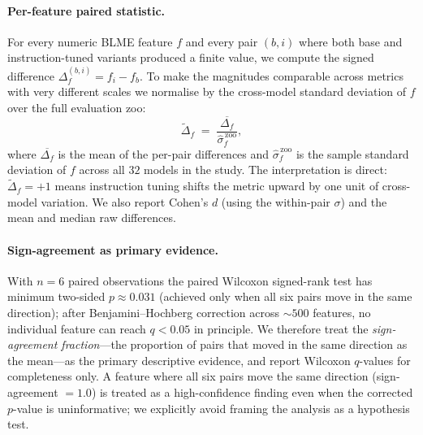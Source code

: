 \documentclass[preprint]{neurips_2025}
\begin{document}
\paragraph{Per-feature paired statistic.}
For every numeric BLME feature $f$ and every pair $(b, i)$ where both base and instruction-tuned variants produced a finite value, we compute the signed difference $\Delta_{f}^{(b,i)} = f_i - f_b$. To make the magnitudes comparable across metrics with very different scales we normalise by the cross-model standard deviation of $f$ over the full evaluation zoo:
\begin{equation}
  \widetilde{\Delta}_f \;=\; \frac{\overline{\Delta_f}}{\hat\sigma_f^{\,\text{zoo}}},
\end{equation}
where $\overline{\Delta_f}$ is the mean of the per-pair differences and $\hat\sigma_f^{\,\text{zoo}}$ is the sample standard deviation of $f$ across all $32$ models in the study. The interpretation is direct: $\widetilde{\Delta}_f = +1$ means instruction tuning shifts the metric upward by one unit of cross-model variation. We also report Cohen's $d$ (using the within-pair $\sigma$) and the mean and median raw differences.

\paragraph{Sign-agreement as primary evidence.}
With $n = 6$ paired observations the paired Wilcoxon signed-rank test has minimum two-sided $p \approx 0.031$ (achieved only when all six pairs move in the same direction); after Benjamini--Hochberg correction across $\sim\!500$ features, no individual feature can reach $q < 0.05$ in principle. We therefore treat the \emph{sign-agreement fraction}---the proportion of pairs that moved in the same direction as the mean---as the primary descriptive evidence, and report Wilcoxon $q$-values for completeness only. A feature where all six pairs move the same direction (sign-agreement $= 1.0$) is treated as a high-confidence finding even when the corrected $p$-value is uninformative; we explicitly avoid framing the analysis as a hypothesis test.
\end{document}
